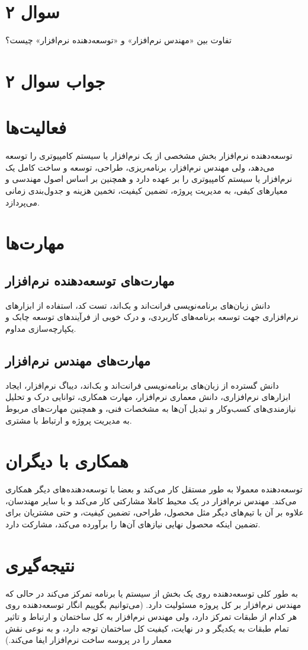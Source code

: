\section*{سوال ۲}

تفاوت بین «مهندس نرم‌افزار» و «توسعه‌دهنده نرم‌افزار» چیست؟

\section*{جواب سوال ۲}

\section*{فعالیت‌ها}
توسعه‌دهنده نرم‌افزار بخش مشخصی از یک نرم‌افزار یا سیستم کامپیوتری را توسعه می‌دهد، ولی مهندس نرم‌افزار، برنامه‌ریزی، طراحی، توسعه و ساخت کامل یک نرم‌افزار یا سیستم کامپیوتری را بر عهده دارد و همچنین بر اساس اصول مهندسی و معیارهای کیفی، به مدیریت پروژه، تضمین کیفیت، تخمین هزینه و جدول‌بندی زمانی می‌پردازد.

\section*{مهارت‌ها}
\subsection*{مهارت‌های توسعه‌دهنده نرم‌افزار}
دانش زبان‌های برنامه‌نویسی فرانت‌اند و بک‌اند، تست کد، استفاده از ابزارهای نرم‌افزاری جهت توسعه برنامه‌های کاربردی، و درک خوبی از فرآیندهای توسعه چابک و یکپارچه‌سازی مداوم.

\subsection*{مهارت‌های مهندس نرم‌افزار}
دانش گسترده از زبان‌های برنامه‌نویسی فرانت‌اند و بک‌اند، دیباگ نرم‌افزار، ایجاد ابزارهای نرم‌افزاری، دانش معماری نرم‌افزار، مهارت همکاری، توانایی درک و تحلیل نیازمندی‌های کسب‌وکار و تبدیل آن‌ها به مشخصات فنی، و همچنین مهارت‌های مربوط به مدیریت پروژه و ارتباط با مشتری.

\section*{همکاری با دیگران}
توسعه‌دهنده معمولا به طور مستقل کار می‌کند و بعضا با توسعه‌دهنده‌های دیگر همکاری می‌کند. مهندس نرم‌افزار در یک محیط کاملا مشارکتی کار می‌کند و با سایر مهندسان، علاوه بر آن با تیم‌های دیگر مثل محصول، طراحی، تضمین کیفیت، و حتی مشتریان برای تضمین اینکه محصول نهایی نیازهای آن‌ها را برآورده می‌کند، مشارکت دارد.

\section*{نتیجه‌گیری}
به طور کلی توسعه‌دهنده روی یک بخش از سیستم یا برنامه تمرکز می‌کند در حالی که مهندس نرم‌افزار بر کل پروژه مسئولیت دارد. (می‌توانیم بگوییم انگار توسعه‌دهنده روی هر کدام از طبقات تمرکز دارد، ولی مهندس نرم‌افزار به کل ساختمان و ارتباط و تاثیر تمام طبقات به یکدیگر و در نهایت، کیفیت کل ساختمان توجه دارد، و به نوعی نقش معمار را در پروسه ساخت نرم‌افزار ایفا می‌کند.)
